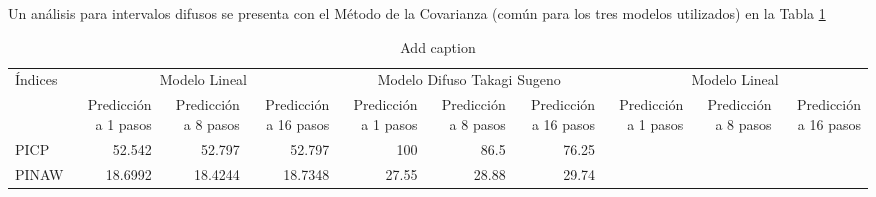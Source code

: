\documentclass[12pt]{article}
\begin{document}
Un análisis para intervalos difusos se presenta con el Método de la Covarianza (común para los tres modelos utilizados) en la  Tabla \ref{t_CompCov}

\begin{table}[htbp]
  \centering
  \caption{Add caption}
    \begin{tabular}{|l|r|r|r|r|r|r|r|r|r|}
    \toprule
    Índices & \multicolumn{3}{c|}{Modelo Lineal} & \multicolumn{3}{c|}{Modelo Difuso Takagi Sugeno} & \multicolumn{3}{c|}{Modelo Lineal} \\
\cmidrule{2-10}          & \multicolumn{1}{p{4.055em}|}{Predicción a 1 pasos} & \multicolumn{1}{p{4.055em}|}{Predicción a 8 pasos} & \multicolumn{1}{p{4.055em}|}{Predicción a 16 pasos} & \multicolumn{1}{p{4.055em}|}{Predicción a 1 pasos} & \multicolumn{1}{p{4.055em}|}{Predicción a 8 pasos} & \multicolumn{1}{p{4.055em}|}{Predicción a 16 pasos} & \multicolumn{1}{p{4.055em}|}{Predicción a 1 pasos} & \multicolumn{1}{p{4.055em}|}{Predicción a 8 pasos} & \multicolumn{1}{p{4.055em}|}{Predicción a 16 pasos} \\
    \midrule
    PICP  & 52.542 & 52.797 & 52.797 & 100   & 86.5 & 76.25    &       &       &  \\
    \midrule
    PINAW & 18.6992   & 18.4244   & 18.7348   & 27.55  & 28.88 & 29.74  &       &       &  \\
    \bottomrule
    \end{tabular}%
  \label{t_CompCov}%
\end{table}%


				



\newpage


\end{document}
